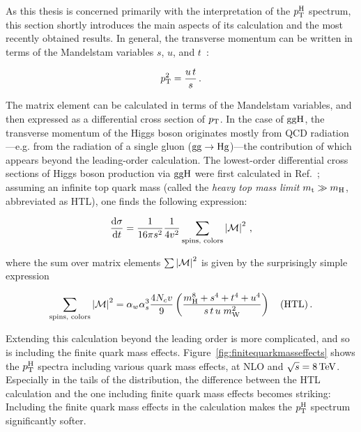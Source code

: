 As this thesis is concerned primarily with the interpretation of the $p_\mathrm{T}^\mathrm{H}$ spectrum, this section shortly introduces the main aspects of its calculation and the most recently obtained results.
% 
In general, the transverse momentum can be written in terms of the Mandelstam variables $s$, $u$, and $t$~\cite{peskin}:
% 
\begin{linenomath*}
\begin{equation}
p_\mathrm{T}^2 = \frac{u \, t}{s}
\,.
\end{equation}
\end{linenomath*}
% 
The matrix element can be calculated in terms of the Mandelstam variables, and then expressed as a differential cross section of $p_\mathrm{T}$.
% 
% 
In the case of $\mathrm{g}\mathrm{g}\mathrm{H}$, the transverse momentum of the Higgs boson originates mostly from QCD radiation---e.g. from the radiation of a single gluon ($\mathrm{g}\mathrm{g}\to\mathrm{H}\mathrm{g}$)---the contribution of which appears beyond the leading-order calculation.
% 
The lowest-order differential cross sections of Higgs boson production via $\mathrm{g}\mathrm{g}\mathrm{H}$ were first calculated in Ref.~\cite{Ellis:1987xu}; assuming an infinite top quark mass (called the \textit{heavy top mass limit} $m_{\mathrm{t}} \gg m_{\mathrm{H}}$, abbreviated as HTL), one finds the following expression:
% 
\begin{linenomath*}
\begin{equation}
\frac{\mathrm{d}\sigma}{\mathrm{d}t} =
\frac{1}{16\pi s^2} \frac{1}{4v^2}
\sum_\text{spins, colors} \left| \mathcal{M} \right |^2
\,,
\end{equation}
\end{linenomath*}
% 
where the sum over matrix elements $\sum\left| \mathcal{M} \right |^2$ is given by the surprisingly simple expression
% 
\begin{linenomath*}
\begin{equation}
\sum_\text{spins, colors} \abs{\mathcal{M}}^2
= \alpha_w \alpha_s^3 \frac{4 N_c v}{9} %
\left(
    \frac{\mh^8 + s^4 + t^4 + u^4}{ s \, t \, u \; m_\wboson^2 }
    \right)
\quad \text{(HTL)}
\,.
\end{equation}
\end{linenomath*}
% 
Extending this calculation beyond the leading order is more complicated, and so is including the finite quark mass effects.
% 
Figure~\ref{fig:finitequarkmasseffects} shows the $p_\mathrm{T}^\mathrm{H}$ spectra including various quark mass effects, at NLO and $\sqrt{s}=8\,\text{TeV}$.
% 
Especially in the tails of the distribution, the difference between the HTL calculation and the one including finite quark mass effects becomes striking: Including the finite quark mass effects in the calculation makes the $p_\mathrm{T}^\mathrm{H}$ spectrum significantly softer.


